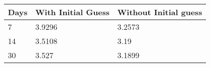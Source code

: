 \begin{tabular}{lll}
Days & With Initial Guess & Without Initial guess \\ 
\hline 
7 & 3.9296 & 3.2573 \\ 
14 & 3.5108 & 3.19 \\ 
30 & 3.527 & 3.1899 \\ 
\hline 
\end{tabular}